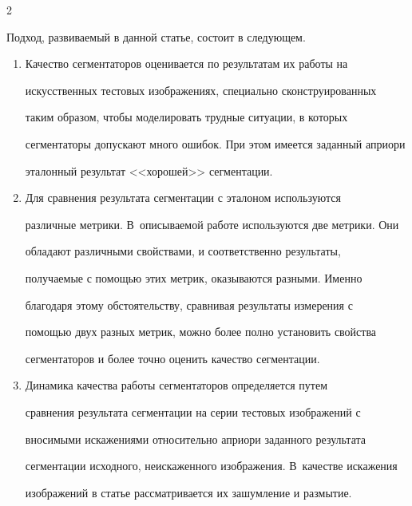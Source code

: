 \begin{multicols}{2}
\begin{figure}[b]
\begin{center}
\end{center}


\vspace*{-6pt}




\end{figure}





  Подход, развиваемый в данной статье, состоит в следующем.


  \begin{enumerate}[1.]


\item Качество сегментаторов оценивается по результатам их работы на 


искусственных тестовых изображениях, специально сконструированных 


таким образом, чтобы моделировать трудные ситуации, в которых 


сегментаторы допускают много ошибок. При этом имеется заданный априори 


эталонный результат <<хорошей>> сегментации.


\item Для сравнения результата сегментации с эталоном используются 


различные метрики. В~описываемой работе используются две метрики. Они 


обладают различными свойствами, и соответственно результаты, 


получаемые с помощью этих метрик, оказываются разными. Именно 


благодаря этому обстоятельству, сравнивая результаты измерения с 


помощью двух разных мет\-рик, можно более полно установить свойства 


сегментаторов и более точно оценить качество сегментации.


\item Динамика качества работы сегментаторов определяется путем 


сравнения результата сегментации на серии тестовых изображений с 


вносимыми искажениями относительно априори заданного результата 


сегментации исходного, неискаженного изображения. В~качестве искажения 


изображений в статье рассматривается их зашумление и размытие.



\end{enumerate}
\end{multicols}
